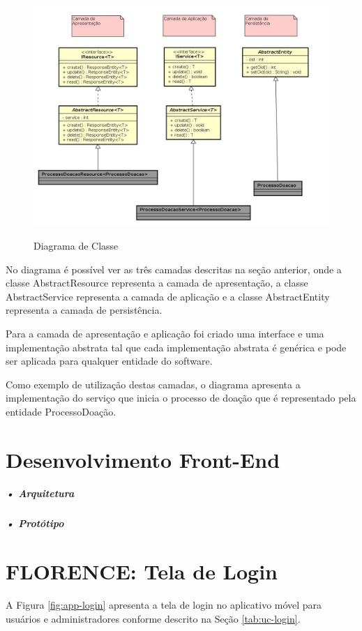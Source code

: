 \documentclass[portuguese,oneside]{tcc}
\begin{document}
\begin{figure}[htp]
\centering
\caption{Diagrama de Classe}
\includegraphics[scale=0.44]{class-diagram}
\label{fig:erDiagram}
\end{figure}

No diagrama é possível ver as três camadas descritas na seção anterior, onde a classe AbstractResource representa a camada de apresentação, a classe AbstractService representa a camada de aplicação e a classe AbstractEntity representa a camada de persistência.

Para a camada de apresentação e aplicação foi criado uma interface e uma implementação abstrata tal que cada implementação abstrata é genérica e pode ser aplicada para qualquer entidade do software.

Como exemplo de utilização destas camadas, o diagrama apresenta a implementação do serviço que inicia o processo de doação que é representado pela entidade ProcessoDoação.

\section{Desenvolvimento Front-End}

\subparagraph{• Arquitetura}

\subparagraph{• Protótipo}

\section{FLORENCE: Tela de Login}
A Figura \ref{fig:app-login} apresenta a tela de login no aplicativo móvel para usuários e administradores conforme descrito na Seção \ref{tab:uc-login}.
\end{document}
